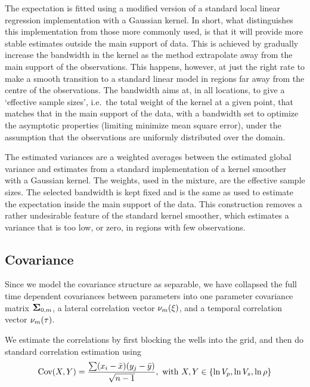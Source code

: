 The expectation is fitted using a modified version of a standard 
local linear regression implementation with a Gaussian kernel. In short, what 
distinguishes this implementation from those more commonly used, is that 
it will provide more stable estimates outside the 
main support of data.
This is achieved by gradually increase the bandwidth in the kernel as the method  
extrapolate  away from the main support of the observations. This happens, 
however, at just the right rate to make a smooth transition to a standard linear model
in regions far away from the centre of the observations.
The bandwidth aims at, in all locations, to give a `effective sample sizes', 
i.e.~the total weight of the kernel at a given point, that matches that
in the main support of the data, with a bandwidth set to optimize the asymptotic
properties (limiting minimize mean square error), under the assumption that the 
observations are uniformly distributed over the domain.
 
The estimated variances are a weighted averages between the estimated global variance  
and estimates from a standard implementation of a kernel smoother with a Gaussian 
kernel. The weights, used in the mixture, are the effective sample sizes. The selected 
bandwidth is kept fixed and is the same as used to estimate the expectation 
inside the main support of the data. This construction removes a rather undesirable 
feature of the standard kernel smoother, which estimates a variance that is too low, or 
zero, in regions with few observations.


\subsection{Covariance}
\label{sec:correstimp}

Since we model the covariance structure as separable, we have
collapsed the full time dependent covariances between parameters into
one parameter covariance matrix $\mbox{\large\ensuremath{\boldsymbol{\Sigma}}}_{0,m}$, a lateral correlation
vector $\nu_m(\xi)$, and a temporal correlation vector
$\nu_m(\tau)$.

We estimate the correlations by first blocking the wells into the
grid, and then do standard correlation estimation using
\begin{equation}
\text{Cov}(X,Y) = \frac{\sum(x_i - \bar{x})(y_j - \bar{y})}{\sqrt{n - 1}},\
  \text{with}\ X,Y\in\{\ln V_p, \ln V_s, \ln\rho\}
\end{equation}

